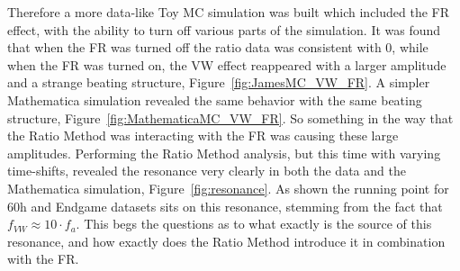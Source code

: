 \documentclass[12pt,letterpaper]{article}
\newcommand{\figref}[1]{Figure~\ref{#1}}
\begin{document}
Therefore a more data-like Toy MC simulation was built which included the FR effect, with the ability to turn off various parts of the simulation. It was found that when the FR was turned off the ratio data was consistent with 0, while when the FR was turned on, the VW effect reappeared with a larger amplitude and a strange beating structure, \figref{fig:JamesMC_VW_FR}. A simpler Mathematica simulation revealed the same behavior with the same beating structure, \figref{fig:MathematicaMC_VW_FR}. So something in the way that the Ratio Method was interacting with the FR was causing these large amplitudes. Performing the Ratio Method analysis, but this time with varying time-shifts, revealed the resonance very clearly in both the data and the Mathematica simulation, \figref{fig:resonance}. As shown the running point for 60h and Endgame datasets sits on this resonance, stemming from the fact that $f_{VW} \approx 10 \cdot f_{a}$. This begs the questions as to what exactly is the source of this resonance, and how exactly does the Ratio Method introduce it in combination with the FR.
\end{document}
